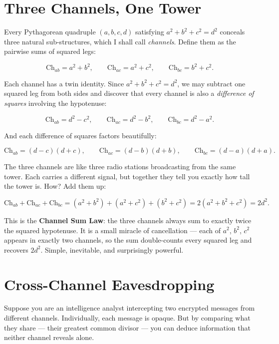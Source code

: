 \documentclass[11pt,twoside,openright]{book}
\theoremstyle{definition}
\theoremstyle{remark}
\begin{document}
\section{Three Channels, One Tower}

Every Pythagorean quadruple $(a, b, c, d)$ satisfying $a^2 + b^2 + c^2 = d^2$ conceals three natural sub-structures, which I shall call \textit{channels}. Define them as the pairwise sums of squared legs:

\[\mathrm{Ch}_{ab} = a^2 + b^2, \qquad \mathrm{Ch}_{ac} = a^2 + c^2, \qquad \mathrm{Ch}_{bc} = b^2 + c^2.\]

Each channel has a twin identity. Since $a^2 + b^2 + c^2 = d^2$, we may subtract one squared leg from both sides and discover that every channel is also a \textit{difference of squares} involving the hypotenuse:

\[\mathrm{Ch}_{ab} = d^2 - c^2, \qquad \mathrm{Ch}_{ac} = d^2 - b^2, \qquad \mathrm{Ch}_{bc} = d^2 - a^2.\]

And each difference of squares factors beautifully:

\[\mathrm{Ch}_{ab} = (d - c)(d + c), \qquad \mathrm{Ch}_{ac} = (d - b)(d + b), \qquad \mathrm{Ch}_{bc} = (d - a)(d + a).\]

The three channels are like three radio stations broadcasting from the same tower. Each carries a different signal, but together they tell you exactly how tall the tower is. How? Add them up:

\[\mathrm{Ch}_{ab} + \mathrm{Ch}_{ac} + \mathrm{Ch}_{bc} = (a^2 + b^2) + (a^2 + c^2) + (b^2 + c^2) = 2(a^2 + b^2 + c^2) = 2d^2.\]

This is the \textbf{Channel Sum Law}: the three channels always sum to exactly twice the squared hypotenuse. It is a small miracle of cancellation --- each of $a^2$, $b^2$, $c^2$ appears in exactly two channels, so the sum double-counts every squared leg and recovers $2d^2$. Simple, inevitable, and surprisingly powerful.



\section{Cross-Channel Eavesdropping}

Suppose you are an intelligence analyst intercepting two encrypted messages from different channels. Individually, each message is opaque. But by comparing what they share --- their greatest common divisor --- you can deduce information that neither channel reveals alone.
\end{document}
